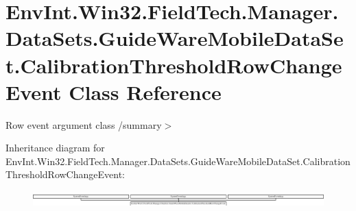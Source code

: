 \hypertarget{class_env_int_1_1_win32_1_1_field_tech_1_1_manager_1_1_data_sets_1_1_guide_ware_mobile_data_set_fbaa872ead219fa1546c6a3dbe0bab70}{}\section{Env\+Int.\+Win32.\+Field\+Tech.\+Manager.\+Data\+Sets.\+Guide\+Ware\+Mobile\+Data\+Set.\+Calibration\+Threshold\+Row\+Change\+Event Class Reference}
\label{class_env_int_1_1_win32_1_1_field_tech_1_1_manager_1_1_data_sets_1_1_guide_ware_mobile_data_set_fbaa872ead219fa1546c6a3dbe0bab70}


Row event argument class /summary$>$  


Inheritance diagram for Env\+Int.\+Win32.\+Field\+Tech.\+Manager.\+Data\+Sets.\+Guide\+Ware\+Mobile\+Data\+Set.\+Calibration\+Threshold\+Row\+Change\+Event\+:\begin{figure}[H]
\begin{center}
\leavevmode
\includegraphics[height=0.589784cm]{class_env_int_1_1_win32_1_1_field_tech_1_1_manager_1_1_data_sets_1_1_guide_ware_mobile_data_set_fbaa872ead219fa1546c6a3dbe0bab70}
\end{center}
\end{figure}
